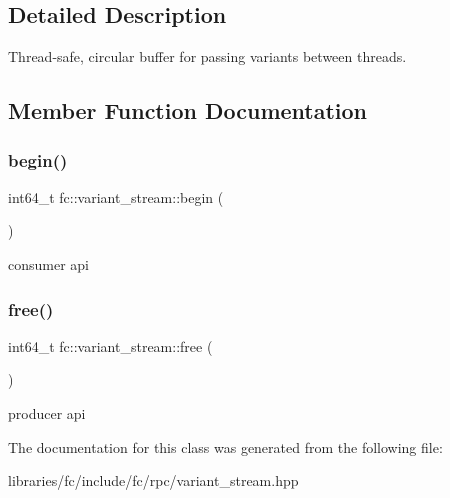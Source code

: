 \subsection{Detailed Description}
Thread-\/safe, circular buffer for passing variants between threads. 

\subsection{Member Function Documentation}
\mbox{\label{classfc_1_1variant__stream_a8a0ba29c9ff02e5eacbbf7cdc838031a}} 
\subsubsection{\texorpdfstring{begin()}{begin()}}
{\footnotesize\ttfamily int64\+\_\+t fc\+::variant\+\_\+stream\+::begin (\begin{DoxyParamCaption}{ }\end{DoxyParamCaption})}

consumer api \mbox{\label{classfc_1_1variant__stream_a27edce830ba6ed70ed293096be85495b}} 
\subsubsection{\texorpdfstring{free()}{free()}}
{\footnotesize\ttfamily int64\+\_\+t fc\+::variant\+\_\+stream\+::free (\begin{DoxyParamCaption}{ }\end{DoxyParamCaption})}

producer api 

The documentation for this class was generated from the following file\+:\begin{DoxyCompactItemize}
\item 
libraries/fc/include/fc/rpc/variant\+\_\+stream.\+hpp\end{DoxyCompactItemize}
